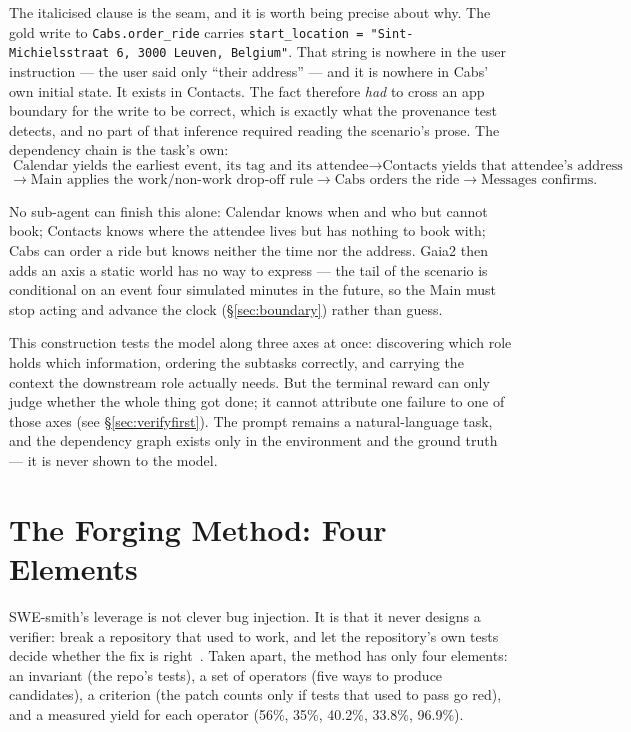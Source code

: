 \documentclass[11pt,a4paper]{article}
\begin{document}
The italicised clause is the seam, and it is worth being precise about why. The gold write to \texttt{Cabs.order\_ride} carries \texttt{start\_location = "Sint-Michielsstraat 6, 3000 Leuven, Belgium"}. That string is nowhere in the user instruction --- the user said only ``their address'' --- and it is nowhere in Cabs' own initial state. It exists in Contacts. The fact therefore \emph{had} to cross an app boundary for the write to be correct, which is exactly what the provenance test detects, and no part of that inference required reading the scenario's prose. The dependency chain is the task's own:
\[
  \text{Calendar yields the earliest event, its tag and its attendee}
  \longrightarrow
  \text{Contacts yields that attendee's address}
\]
\[
  \longrightarrow
  \text{Main applies the work/non-work drop-off rule}
  \longrightarrow
  \text{Cabs orders the ride}
  \longrightarrow
  \text{Messages confirms}.
\]

No sub-agent can finish this alone: Calendar knows when and who but cannot book; Contacts knows where the attendee lives but has nothing to book with; Cabs can order a ride but knows neither the time nor the address. Gaia2 then adds an axis a static world has no way to express --- the tail of the scenario is conditional on an event four simulated minutes in the future, so the Main must stop acting and advance the clock (\S\ref{sec:boundary}) rather than guess.

This construction tests the model along three axes at once: discovering which role holds which information, ordering the subtasks correctly, and carrying the context the downstream role actually needs. But the terminal reward can only judge whether the whole thing got done; it cannot attribute one failure to one of those axes (see \S\ref{sec:verifyfirst}). The prompt remains a natural-language task, and the dependency graph exists only in the environment and the ground truth --- it is never shown to the model.

\section{The Forging Method: Four Elements}

SWE-smith's leverage is not clever bug injection. It is that it never designs a verifier: break a repository that used to work, and let the repository's own tests decide whether the fix is right~\cite{yang2025swesmith}. Taken apart, the method has only four elements: an invariant (the repo's tests), a set of operators (five ways to produce candidates), a criterion (the patch counts only if tests that used to pass go red), and a measured yield for each operator (56\%, 35\%, 40.2\%, 33.8\%, 96.9\%).
\end{document}
